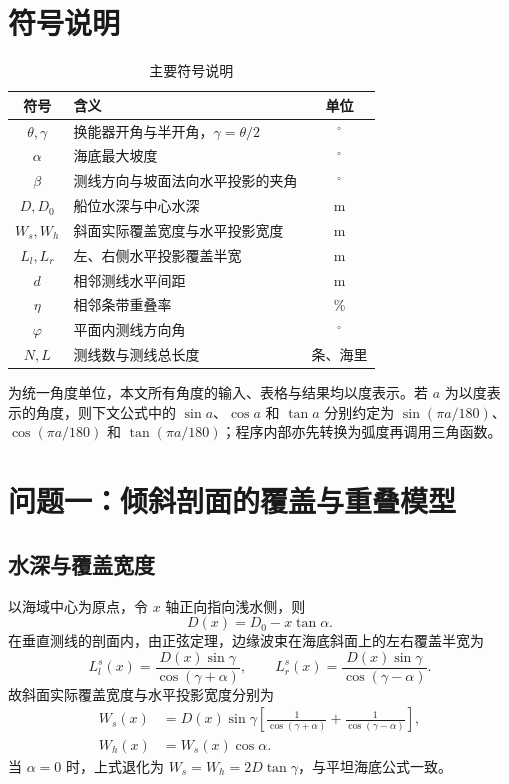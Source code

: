 \documentclass[withoutpreface,notoc]{cumcmthesis}
\begin{document}
\section{符号说明}
\begin{table}[H]
\centering
\caption{主要符号说明}
\label{tab:symbols}
\begin{tabularx}{\textwidth}{CLC}
\toprule
符号 & 含义 & 单位\\
\midrule
$\theta,\gamma$ & 换能器开角与半开角，$\gamma=\theta/2$ & $^\circ$\\
$\alpha$ & 海底最大坡度 & $^\circ$\\
$\beta$ & 测线方向与坡面法向水平投影的夹角 & $^\circ$\\
$D,D_0$ & 船位水深与中心水深 & m\\
$W_s,W_h$ & 斜面实际覆盖宽度与水平投影宽度 & m\\
$L_l,L_r$ & 左、右侧水平投影覆盖半宽 & m\\
$d$ & 相邻测线水平间距 & m\\
$\eta$ & 相邻条带重叠率 & \%\\
$\varphi$ & 平面内测线方向角 & $^\circ$\\
$N,L$ & 测线数与测线总长度 & 条、海里\\
\bottomrule
\end{tabularx}
\end{table}
为统一角度单位，本文所有角度的输入、表格与结果均以度表示。若 $a$ 为以度表示的角度，则下文公式中的 $\sin a$、$\cos a$ 和 $\tan a$ 分别约定为
$\sin(\pi a/180)$、$\cos(\pi a/180)$ 和 $\tan(\pi a/180)$；程序内部亦先转换为弧度再调用三角函数。

\section{问题一：倾斜剖面的覆盖与重叠模型}
\subsection{水深与覆盖宽度}
以海域中心为原点，令 $x$ 轴正向指向浅水侧，则
\begin{equation}\label{eq:depth1}
D(x)=D_0-x\tan\alpha.
\end{equation}
在垂直测线的剖面内，由正弦定理，边缘波束在海底斜面上的左右覆盖半宽为
\begin{equation}\label{eq:sideslope}
L^s_l(x)=\frac{D(x)\sin\gamma}{\cos(\gamma+\alpha)},\qquad
L^s_r(x)=\frac{D(x)\sin\gamma}{\cos(\gamma-\alpha)}.
\end{equation}
故斜面实际覆盖宽度与水平投影宽度分别为
\begin{align}
W_s(x)&=D(x)\sin\gamma\left[\frac1{\cos(\gamma+\alpha)}+\frac1{\cos(\gamma-\alpha)}\right],\label{eq:ws}\\
W_h(x)&=W_s(x)\cos\alpha.\label{eq:wh}
\end{align}
当 $\alpha=0$ 时，上式退化为 $W_s=W_h=2D\tan\gamma$，与平坦海底公式一致。
\end{document}
